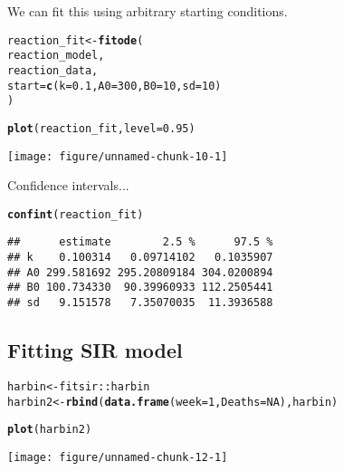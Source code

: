\documentclass{article}\usepackage[]{graphicx}\usepackage[]{color}
\makeatletter
\def\maxwidth{ %
  \ifdim\Gin@nat@width>\linewidth
    \linewidth
  \else
    \Gin@nat@width
  \fi
}
\newcommand{\hlnum}[1]{\textcolor[rgb]{0.686,0.059,0.569}{#1}}%
\newcommand{\hlopt}[1]{\textcolor[rgb]{0,0,0}{#1}}%
\newcommand{\hlstd}[1]{\textcolor[rgb]{0.345,0.345,0.345}{#1}}%
\newcommand{\hlkwb}[1]{\textcolor[rgb]{0.69,0.353,0.396}{#1}}%
\newcommand{\hlkwc}[1]{\textcolor[rgb]{0.333,0.667,0.333}{#1}}%
\newcommand{\hlkwd}[1]{\textcolor[rgb]{0.737,0.353,0.396}{\textbf{#1}}}%
\newenvironment{kframe}{%
 \def\at@end@of@kframe{}%
 \ifinner\ifhmode%
  \def\at@end@of@kframe{\end{minipage}}%
  \begin{minipage}{\columnwidth}%
 \fi\fi%
 \def\FrameCommand##1{\hskip\@totalleftmargin \hskip-\fboxsep
 \colorbox{shadecolor}{##1}\hskip-\fboxsep
     \hskip-\linewidth \hskip-\@totalleftmargin \hskip\columnwidth}%
 \MakeFramed {\advance\hsize-\width
   \@totalleftmargin\z@ \linewidth\hsize
   \@setminipage}}%
 {\par\unskip\endMakeFramed%
 \at@end@of@kframe}
\newenvironment{knitrout}{}{} %
\makeatother
\begin{document}
We can fit this using arbitrary starting conditions.

\begin{knitrout}
\color{fgcolor}\begin{kframe}
\begin{alltt}
\hlstd{reaction_fit} \hlkwb{<-} \hlkwd{fitode}\hlstd{(}
    \hlstd{reaction_model,}
    \hlstd{reaction_data,}
    \hlkwc{start}\hlstd{=}\hlkwd{c}\hlstd{(}\hlkwc{k}\hlstd{=}\hlnum{0.1}\hlstd{,} \hlkwc{A0}\hlstd{=}\hlnum{300}\hlstd{,} \hlkwc{B0}\hlstd{=}\hlnum{10}\hlstd{,} \hlkwc{sd}\hlstd{=}\hlnum{10}\hlstd{)}
\hlstd{)}
\end{alltt}


{\ttfamily\noindent\itshape\color{messagecolor}{\#\# Fitting ode ...}}

{\ttfamily\noindent\itshape\color{messagecolor}{\#\# Computing vcov on the original scale ...}}\begin{alltt}
\hlkwd{plot}\hlstd{(reaction_fit,} \hlkwc{level}\hlstd{=}\hlnum{0.95}\hlstd{)}
\end{alltt}
\end{kframe}
\texttt{[image: figure/unnamed-chunk-10-1]} 

\end{knitrout}

Confidence intervals...

\begin{knitrout}
\color{fgcolor}\begin{kframe}
\begin{alltt}
\hlkwd{confint}\hlstd{(reaction_fit)}
\end{alltt}
\begin{verbatim}
##      estimate        2.5 %      97.5 %
## k    0.100314   0.09714102   0.1035907
## A0 299.581692 295.20809184 304.0200894
## B0 100.734330  90.39960933 112.2505441
## sd   9.151578   7.35070035  11.3936588
\end{verbatim}
\end{kframe}
\end{knitrout}

\subsection{Fitting SIR model}

\begin{knitrout}
\color{fgcolor}\begin{kframe}
\begin{alltt}
\hlstd{harbin} \hlkwb{<-} \hlstd{fitsir}\hlopt{::}\hlstd{harbin}
\hlstd{harbin2} \hlkwb{<-} \hlkwd{rbind}\hlstd{(}\hlkwd{data.frame}\hlstd{(}\hlkwc{week}\hlstd{=}\hlnum{1}\hlstd{,} \hlkwc{Deaths}\hlstd{=}\hlnum{NA}\hlstd{), harbin)}

\hlkwd{plot}\hlstd{(harbin2)}
\end{alltt}
\end{kframe}
\texttt{[image: figure/unnamed-chunk-12-1]} 

\end{knitrout}
\end{document}
